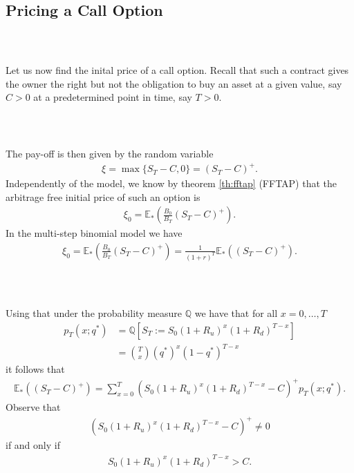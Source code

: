 \documentclass{beamer}
\numberwithin{equation}{section}
\begin{document}
\subsection{Pricing a Call Option}

\begin{frame}\frametitle{{\normalsize \secname} \\ {\large \subsecname}}
    Let us now find the inital price of a call option. 
    Recall that such a contract gives the owner the right but not the obligation to buy an asset at a given value, say $C > 0$ at a predetermined point in time, say $T > 0$. 
\end{frame}

\begin{frame}\frametitle{{\normalsize \secname} \\ {\large \subsecname}}
    The pay-off is then given by the random variable
    \begin{align}
        \xi = \max\{ S_T - C, 0\} = (S_T - C)^+.
    \end{align}
    Independently of the model, we know by theorem \ref{th:fftap} (FFTAP) that the arbitrage free initial price of such an option is 
    \begin{align}
        \xi_0 = \mathbb{E}_*\left( \frac{B_0}{B_T}(S_T - C)^+\right). 
    \end{align}
    In the multi-step binomial model we have
    \begin{align}
        \xi_0 = \mathbb{E}_* \left( \frac{B_0}{B_T}(S_T - C)^+ \right) = \frac{1}{(1+r)^T} \mathbb{E}_* \left( (S_T-C)^+\right). 
    \end{align}
\end{frame}

\begin{frame}\frametitle{{\normalsize \secname} \\ {\large \subsecname}}
    Using that under the probability measure $\mathbb{Q}$ we have that for all $x = 0, \ldots, T$
    \begin{align}
        p_T(x; q^*) &= \mathbb{Q}\left[ S_T := S_0(1+ R_u)^x(1+R_d)^{T-x}\right]\\
        &= \binom{T}{x}( q^* )^x(1-q^*)^{T-x}
    \end{align}
    it follows that
    \begingroup
    \footnotesize
    \begin{align}
        \mathbb{E}_* \left( (S_T - C)^+ \right) = \sum_{x=0}^T \left( S_0(1+R_u)^x(1+R_d)^{T-x} - C \right)^+ p_T(x; q^*).
    \end{align}
    \endgroup
    Observe that 
    \begin{align}
        \left( S_0(1+R_u)^x(1+R_d)^{T-x} - C \right)^+ \neq 0
    \end{align}
    if and only if 
    \begin{align}
        S_0(1+R_u)^x(1+R_d)^{T-x} > C. 
    \end{align}
\end{frame}
\end{document}
